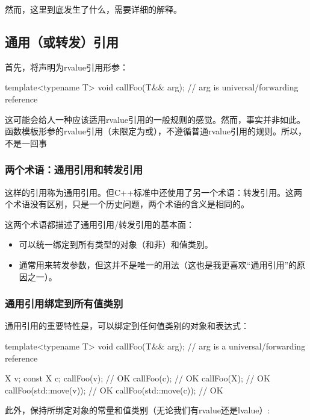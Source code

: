 然而，这里到底发生了什么，需要详细的解释。

\subsection{通用（或转发）引用}

首先，将声明为rvalue引用形参：

\begin{cppcode}
template<typename T>
void callFoo(T&& arg); // arg is universal/forwarding reference
\end{cppcode}

这可能会给人一种应该适用rvalue引用的一般规则的感觉。然而，事实并非如此。函数模板形参的rvalue引用（未限定为或），不遵循普通rvalue引用的规则。所以，不是一回事

\subsubsection{两个术语：通用引用和转发引用}

这样的引用称为通用引用。但C++标准中还使用了另一个术语：转发引用。这两个术语没有区别，只是一个历史问题，两个术语的含义是相同的。

这两个术语都描述了通用引用/转发引用的基本面：

\begin{itemize}
	\item 可以统一绑定到所有类型的对象（和非）和值类别。
	\item 通常用来转发参数，但这并不是唯一的用法（这也是我更喜欢“通用引用”的原因之一）。
\end{itemize}

\subsubsection{通用引用绑定到所有值类别}

通用引用的重要特性是，可以绑定到任何值类别的对象和表达式：

\begin{cppcode}
template<typename T>
void callFoo(T&& arg); // arg is a universal/forwarding reference

X v;
const X c;
callFoo(v); // OK
callFoo(c); // OK
callFoo(X{}); // OK
callFoo(std::move(v)); // OK
callFoo(std::move(c)); // OK
\end{cppcode}

此外，保持所绑定对象的常量和值类别（无论我们有rvalue还是lvalue）:

